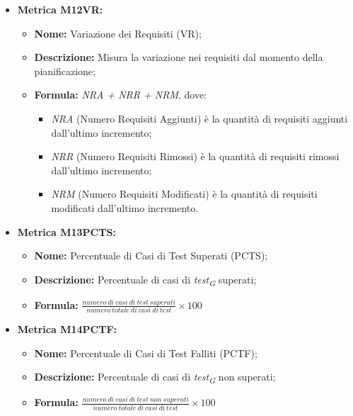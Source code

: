 \begin{itemize}
    \item \hypertarget{item:M12VR}{\textbf{Metrica M12VR:}}
    \begin{minipage}[t]{0.9\textwidth}
          \begin{itemize}
              \item \textbf{Nome:} Variazione dei Requisiti (VR);
              \item \textbf{Descrizione:} Misura la variazione nei requisiti dal momento della pianificazione;
              \item \textbf{Formula:} \textit{NRA + NRR + NRM}, dove:\begin{itemize}
                \item \textit{NRA} (Numero Requisiti Aggiunti) è la quantità di requisiti aggiunti dall'ultimo incremento;
                \item \textit{NRR} (Numero Requisiti Rimossi) è la quantità di requisiti rimossi dall'ultimo incremento;
                \item \textit{NRM} (Numero Requisiti Modificati) è la quantità di requisiti modificati dall'ultimo incremento.
              \end{itemize}
          \end{itemize}
        \end{minipage}
    
    \item \hypertarget{item:M13PCTS}{\textbf{Metrica M13PCTS:}}
    \begin{minipage}[t]{0.9\textwidth}
          \begin{itemize}
           \item \textbf{Nome:} Percentuale di Casi di Test Superati (PCTS);
           \item \textbf{Descrizione:} Percentuale di casi di \textit{test}\textsubscript{\textit{G}} superati;
           \item \textbf{Formula:} $\frac{numero \ di \ casi \ di \ test \ superati}{numero \ totale \ di \ casi \ di \ test}\times 100$
          \end{itemize}
        \end{minipage}

    \item \hypertarget{item:M14PCTF}{\textbf{Metrica M14PCTF:}}
    \begin{minipage}[t]{0.9\textwidth}
          \begin{itemize}
           \item \textbf{Nome:} Percentuale di Casi di Test Falliti (PCTF);
           \item \textbf{Descrizione:} Percentuale di casi di \textit{test}\textsubscript{\textit{G}} non superati;
           \item \textbf{Formula:} $\frac{numero \ di \ casi \ di \ test \ non \ superati}{numero \ totale \ di \ casi \ di \ test}\times 100$
          \end{itemize}
        \end{minipage}


\end{itemize}
